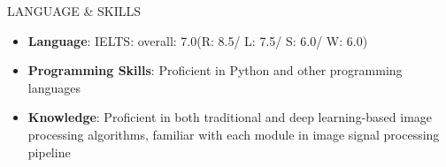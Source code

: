 \documentclass{resume} %
\begin{document}




\begin{rSection}{LANGUAGE \& SKILLS} 
\begin{itemize}
    \setlength{\itemsep}{0pt}
    \setlength{\parsep}{0pt}
    \setlength{\parskip}{0pt}
    \item \textbf{Language}: IELTS: overall: 7.0(R: 8.5/ L: 7.5/ S: 6.0/ W: 6.0)
    \item \textbf{Programming Skills}: Proficient in Python and other programming languages
    \item \textbf{Knowledge}: Proficient in both traditional and deep learning-based image processing algorithms, familiar with each module in image signal processing pipeline
\end{itemize}


\end{rSection}
\end{document}
